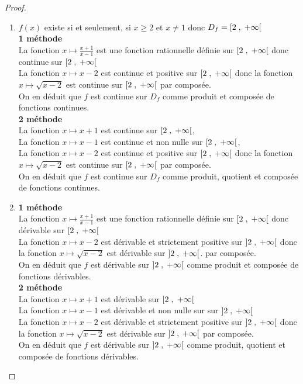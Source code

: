 \begin{proof}
\begin{enumerate}
\item $ f(x) $ existe si et seulement, si $ x \geq 2 $ et  $ x\neq 1 $ donc $ D_{f}=\left[2 \;,\; +\infty\right[ $ \\ \textbf{ 1\iere{} méthode } \\ La fonction $ x \mapsto \frac{x+1}{x-1} $ est une fonction rationnelle définie sur $\left[2 \;,\; +\infty\right[  $ donc continue  sur $\left[2 \;,\; +\infty\right[  $ \\ La fonction $ x \mapsto x-2$ est continue et positive sur $\left[2 \;,\; +\infty\right[  $  donc la fonction $ x \mapsto \sqrt{x-2} $ est continue sur $\left[2 \;,\; +\infty\right[  $  par composée.\\ On en déduit que $ f $ est continue sur $  D_{f}$ comme produit et composée de  fonctions continues. \\
\textbf{ 2\iere{} méthode } \\  La fonction $ x \mapsto x+1 $ est  continue  sur $\left[2 \;,\; +\infty\right[ $, \\ La fonction $ x \mapsto x-1 $ est  continue et non nulle  sur  $\left[2 \;,\; +\infty\right[ $,   \\ La fonction $ x \mapsto x-2$ est continue et positive sur $\left[2 \;,\; +\infty\right[$  donc la fonction $ x \mapsto \sqrt{x-2} $ est continue sur $\left[2 \;,\; +\infty\right[ $  par composée.\\ On en déduit que $ f $ est continue sur $  D_{f}$ comme produit, quotient et composée de  fonctions continues.\\

\item  \textbf{ 1\iere{} méthode } \\ La fonction $ x \mapsto \frac{x+1}{x-1} $ est une fonction rationnelle définie sur $\left[2 \;,\; +\infty\right[  $ donc  dérivable sur $\left[2 \;,\; +\infty\right[  $ \\ La fonction $ x \mapsto x-2$ est dérivable et strictement positive sur $\left]2 \;,\; +\infty\right[$ donc la fonction $ x \mapsto \sqrt{x-2} $ est  dérivable sur $\left]2 \;,\; +\infty\right[$. par composée.\\ On en déduit que $ f $ est dérivable  sur $\left]2 \;,\; +\infty\right[$ comme produit et composée de  fonctions dérivables. \\

\textbf{ 2\iere{} méthode } \\  La fonction $ x \mapsto x+1 $ est  dérivable sur $\left[2 \;,\; +\infty\right[ $ \\ La fonction $ x \mapsto x-1 $ est  dérivable et non nulle  sur sur $\left]2 \;,\; +\infty\right[ $   \\ La fonction $ x \mapsto x-2$ est  dérivable et strictement positive sur $\left]2 \;,\; +\infty\right[$ donc la fonction $ x \mapsto \sqrt{x-2} $ est   dérivable sur $\left]2 \;,\; +\infty\right[$ par composée.\\ On en déduit que $ f $ est dérivable  sur $\left]2 \;,\; +\infty\right[$ comme produit, quotient et composée de  fonctions dérivables. 


\end{enumerate}
\end{proof}
